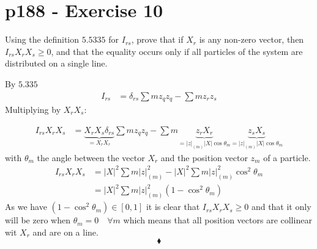 \section{p188 - Exercise 10}
\begin{tcolorbox}
Using the definition $\mathbf{5.5335}$ for $I_{rs}$, prove that if $X_r$ is any non-zero vector, then $I_{rs}X_rX_s \geq 0$, and that the equality occurs only if all particles of the system are distributed on a single line.
\end{tcolorbox}
By  $\mathbf{5.335}$
\begin{align}
I_{rs}&= \delta_{rs}\sum m z_qz_q - \sum m z_r z_s
\end{align}
Multiplying by $X_rX_s$:

\begin{align}
I_{rs}X_rX_s&= \underbrace{X_r X_s \delta_{rs}}_{=X_rX_r}\sum m z_qz_q - \sum m \underbrace{z_rX_r}_{=\left|z\right|_{(m)}\left|X\right|\cos{\theta}_m }\underbrace{ z_sX_s}_{=\left|z\right|_{(m)}\left|X\right|\cos{\theta}_m }
\end{align}
with $\theta_m$ the angle between the vector $X_r$ and the position vector $z_m$ of a particle.
\begin{align}
I_{rs}X_rX_s &=\left|X\right|^2\sum m \left|z\right|_{(m)}^2 - \left|X\right|^2\sum m\left|z\right|_{(m)}^2\cos^2{\theta}_m \\
&=\left|X\right|^2\sum m \left|z\right|_{(m)}^2\left(1 - \cos^2{\theta}_m \right)
\end{align}
As we have $\left(1 - \cos^2{\theta}_m \right) \in [0,1]$ it is clear that $I_{rs}X_rX_s  \geq0$ and that it only will be zero when $\theta_m = 0 \quad \forall m$ which means that all position vectors are collinear wit $X_r$ and are on a line.
$$\blacklozenge$$
\newpage

